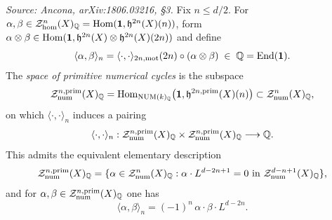 \begin{definition}
  \label{def:primitive-pairing}
  \textit{Source: Ancona, arXiv:1806.03216, §3.}
  Fix \(n \leq d/2\). For
  \(\alpha, \beta \in \mathcal{Z}^{n}_{\hom}(X)_{\mathbb{Q}} =
  \mathrm{Hom}(\mathbf{1}, \mathfrak{h}^{2n}(X)(n))\), form
  \(\alpha \otimes \beta \in
  \mathrm{Hom}(\mathbf{1}, \mathfrak{h}^{2n}(X) \otimes \mathfrak{h}^{2n}(X)(2n))\) and define
  \[\langle \alpha, \beta \rangle_{n} =
    \langle \cdot, \cdot \rangle_{2n,\mathrm{mot}}(2n) \circ (\alpha \otimes \beta)
    \;\in\; \mathbb{Q} = \mathrm{End}(\mathbf{1}).\]
  The \emph{space of primitive numerical cycles} is the subspace
  \[\mathcal{Z}^{n,\mathrm{prim}}_{\mathrm{num}}(X)_{\mathbb{Q}} =
    \mathrm{Hom}_{\mathrm{NUM}(k)_{\mathbb{Q}}}\bigl(\mathbf{1}, \mathfrak{h}^{2n,\mathrm{prim}}(X)(n)\bigr)
    \subset \mathcal{Z}^{n}_{\mathrm{num}}(X)_{\mathbb{Q}},\]
  on which \(\langle \cdot, \cdot \rangle_{n}\) induces a pairing
  \[\langle \cdot, \cdot \rangle_{n} :
    \mathcal{Z}^{n,\mathrm{prim}}_{\mathrm{num}}(X)_{\mathbb{Q}} \times
    \mathcal{Z}^{n,\mathrm{prim}}_{\mathrm{num}}(X)_{\mathbb{Q}} \longrightarrow \mathbb{Q}.\]
  This admits the equivalent elementary description
  \[\mathcal{Z}^{n,\mathrm{prim}}_{\mathrm{num}}(X)_{\mathbb{Q}} =
    \{\alpha \in \mathcal{Z}^{n}_{\mathrm{num}}(X)_{\mathbb{Q}} :
    \alpha \cdot L^{d-2n+1} = 0 \text{ in } \mathcal{Z}^{d-n+1}_{\mathrm{num}}(X)_{\mathbb{Q}}\},\]
  and for \(\alpha, \beta \in \mathcal{Z}^{n,\mathrm{prim}}_{\mathrm{num}}(X)_{\mathbb{Q}}\) one has
  \[\langle \alpha, \beta \rangle_{n} = (-1)^n\, \alpha \cdot \beta \cdot L^{d-2n}.\]
\end{definition}

